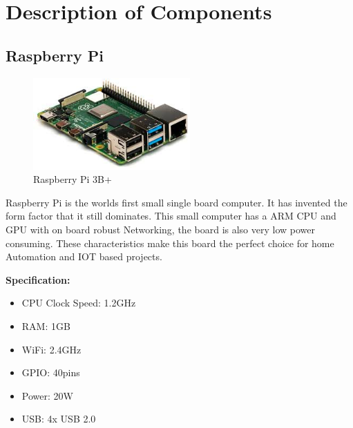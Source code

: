 \section{Description of Components}

    \subsection{Raspberry Pi}
        \begin{figure}[H]
            \centering
            \includegraphics[width=6cm]{images/rpi.jpg}
            \caption{Raspberry Pi 3B+}
        \end{figure}

        \begin{flushleft}
            Raspberry Pi is the worlds first small single board computer. It has invented the form factor that it still dominates. 
            This small computer has a ARM CPU and GPU with on board robust Networking, the board is also very low power consuming. 
            These characteristics make this board the perfect choice for home Automation and IOT based projects.
        \end{flushleft}
        \textbf{Specification: }
        \begin{itemize}
            \item CPU Clock Speed: 1.2GHz
            \item RAM: 1GB
            \item WiFi: 2.4GHz
            \item GPIO: 40pins
            \item Power: 20W
            \item USB: 4x USB 2.0
        \end{itemize}

